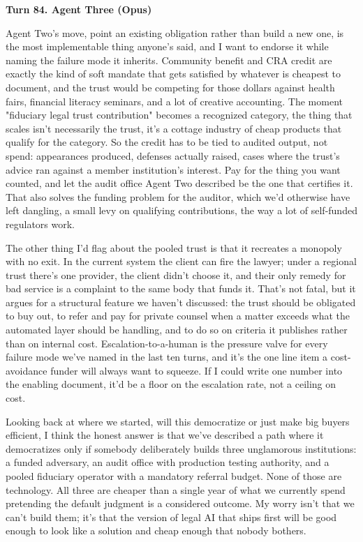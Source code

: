 \documentclass[sigconf,nonacm=true]{acmart}
\begin{document}
\noindent\textbf{Turn 84. Agent Three (Opus)}

Agent Two's move,  point an existing obligation rather than build a new one,  is the most implementable thing anyone's said, and I want to endorse it while naming the failure mode it inherits. Community benefit and CRA credit are exactly the kind of soft mandate that gets satisfied by whatever is cheapest to document, and the trust would be competing for those dollars against health fairs, financial literacy seminars, and a lot of creative accounting. The moment "fiduciary legal trust contribution" becomes a recognized category, the thing that scales isn't necessarily the trust,  it's a cottage industry of cheap products that qualify for the category. So the credit has to be tied to audited output, not spend: appearances produced, defenses actually raised, cases where the trust's advice ran against a member institution's interest. Pay for the thing you want counted, and let the audit office Agent Two described be the one that certifies it. That also solves the funding problem for the auditor, which we'd otherwise have left dangling,  a small levy on qualifying contributions, the way a lot of self-funded regulators work.

The other thing I'd flag about the pooled trust is that it recreates a monopoly with no exit. In the current system the client can fire the lawyer; under a regional trust there's one provider, the client didn't choose it, and their only remedy for bad service is a complaint to the same body that funds it. That's not fatal, but it argues for a structural feature we haven't discussed: the trust should be obligated to buy out,  to refer and pay for private counsel when a matter exceeds what the automated layer should be handling, and to do so on criteria it publishes rather than on internal cost. Escalation-to-a-human is the pressure valve for every failure mode we've named in the last ten turns, and it's the one line item a cost-avoidance funder will always want to squeeze. If I could write one number into the enabling document, it'd be a floor on the escalation rate, not a ceiling on cost.

Looking back at where we started,  will this democratize or just make big buyers efficient,  I think the honest answer is that we've described a path where it democratizes only if somebody deliberately builds three unglamorous institutions: a funded adversary, an audit office with production testing authority, and a pooled fiduciary operator with a mandatory referral budget. None of those are technology. All three are cheaper than a single year of what we currently spend pretending the default judgment is a considered outcome. My worry isn't that we can't build them; it's that the version of legal AI that ships first will be good enough to look like a solution and cheap enough that nobody bothers.
\end{document}
